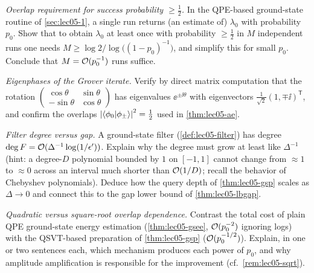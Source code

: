 \begin{exercise}\label{ex:lec05-3}
\emph{Overlap requirement for success probability $\ge\tfrac12$.} In the
QPE-based ground-state routine of \cref{sec:lec05-1}, a single run returns (an
estimate of) $\lambda_0$ with probability $p_0$. Show that to obtain $\lambda_0$
at least once with probability $\ge\tfrac12$ in $M$ independent runs one needs
$M\ge\log 2/\log\bigl((1-p_0)^{-1}\bigr)$, and simplify this for small $p_0$.
Conclude that $M=\mathcal{O}(p_0^{-1})$ runs suffice.
\end{exercise}

\begin{exercise}\label{ex:lec05-4}
\emph{Eigenphases of the Grover iterate.} Verify by direct matrix computation that
the rotation $\left(\begin{smallmatrix}\cos\theta&\sin\theta\\-\sin\theta&
\cos\theta\end{smallmatrix}\right)$ has eigenvalues $\ee^{\pm\ii\theta}$ with
eigenvectors $\tfrac{1}{\sqrt2}(1,\mp\ii)^{\mathsf T}$, and confirm the overlaps
$\left\lvert \braket{\phi_0|\phi_\pm} \right\rvert^2=\tfrac12$ used in \cref{thm:lec05-ae}.
\end{exercise}

\begin{exercise}\label{ex:lec05-5}
\emph{Filter degree versus gap.} A ground-state filter (\cref{def:lec05-filter})
has degree $\deg F=\mathcal{O}(\Delta^{-1}\log(1/\epsilon'))$. Explain why the degree
must grow at least like $\Delta^{-1}$ (hint: a degree-$D$ polynomial bounded by
$1$ on $[-1,1]$ cannot change from $\approx1$ to $\approx0$ across an interval much
shorter than $\mathcal{O}(1/D)$; recall the behavior of Chebyshev polynomials). Deduce
how the query depth of \cref{thm:lec05-gsp} scales as $\Delta\to0$ and connect
this to the gap lower bound of \cref{thm:lec05-lbgap}.
\end{exercise}

\begin{exercise}\label{ex:lec05-6}
\emph{Quadratic versus square-root overlap dependence.} Contrast the total cost of
plain QPE ground-state energy estimation (\cref{thm:lec05-gsee},
$\mathcal{O}(p_0^{-2})$ ignoring logs) with the QSVT-based preparation of
\cref{thm:lec05-gsp} ($\mathcal{O}(p_0^{-1/2})$). Explain, in one or two sentences each,
which mechanism produces each power of $p_0$, and why amplitude amplification is
responsible for the improvement (cf.\ \cref{rem:lec05-sqrt}).
\end{exercise}

